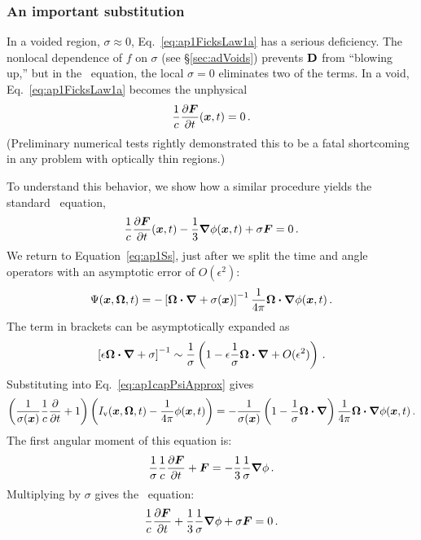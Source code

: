 \subsubsection{An important substitution}
In a voided region, $\sigma\approx 0$, Eq.~\eqref{eq:ap1FicksLaw1a}
has a serious deficiency. The nonlocal dependence of $f$ on $\sigma$ (see
\S\ref{sec:adVoids}) prevents $\mathbf{D}$ from ``blowing up,'' but in the \APone\
equation, the local $\sigma=0$ eliminates two of the terms. In a void,
Eq.~\eqref{eq:ap1FicksLaw1a} becomes the unphysical
\begin{equation*}
  \frac{1}{c}\frac{\partial \bm{F}}{\partial t}(\bm{x},t) = 0\,.
\end{equation*}
(Preliminary numerical tests rightly demonstrated this to be a fatal
shortcoming in any problem with optically thin regions.)

To understand this behavior, we show how a similar procedure yields the standard
\Pone\ equation,
\begin{equation*}
  \frac{1}{c}\frac{\partial \bm{F}}{\partial t}(\bm{x},t) - \frac{1}{3}\bm{\nabla} \phi(\bm{x},t)
  + \sigma \bm{F} = 0\,.
\end{equation*}
We return to Equation~\eqref{eq:ap1Ss}, just after we split the time and angle
operators with an asymptotic error of $O(\epsilon^2)$:
\begin{equation*}
  \Psi(\bm{x},\bm{\Omega},t)
  = - \left[ \bm{\Omega}\bm{\cdot} \bm{\nabla} + \sigma(\bm{x}) \right]^{-1} \frac{1}{4\pi} \bm{\Omega}\bm{\cdot} \bm{\nabla} \phi (\bm{x},t)\,.
\end{equation*}
The term in brackets can be asymptotically expanded as
\begin{equation*}
  \left[ \epsilon \bm{\Omega}\bm{\cdot} \bm{\nabla} + \sigma \right]^{-1}
  \sim \frac{1}{\sigma} \left( 1
  - \epsilon \frac{1}{\sigma} \bm{\Omega}\bm{\cdot} \bm{\nabla} + O(\epsilon^2) \right)\,.
\end{equation*}
Substituting into Eq.~\eqref{eq:ap1capPsiApprox} gives
\begin{equation*}
  \left( \frac{1}{\sigma(\bm{x})} \frac{1}{c}\frac{\partial }{\partial t} + 1 \right)
  \left( I_\mathrm{v}(\bm{x},\bm{\Omega},t) - \frac{1}{4\pi} \phi(\bm{x},t) \right)
  = - \frac{1}{\sigma(\bm{x})} \left( 1 - \frac{1}{\sigma} \bm{\Omega}\bm{\cdot}
  \bm{\nabla} \right) \frac{1}{4\pi} \bm{\Omega}\bm{\cdot} \bm{\nabla} \phi(\bm{x},t) \,.
\end{equation*}
The first angular moment of this equation is:
\begin{equation*}
  \frac{1}{\sigma} \frac{1}{c}\frac{\partial \bm{F}}{\partial t} 
  + \bm{F}
  = - \frac{1}{3}\frac{1}{\sigma} \bm{\nabla} \phi \,.
\end{equation*}
Multiplying by $\sigma$ gives the \Pone\ equation:
\begin{equation*}
  \frac{1}{c}\frac{\partial \bm{F}}{\partial t} + \frac{1}{3}\frac{1}{\sigma} \bm{\nabla} \phi
  + \sigma\bm{F}
  = 0 \,.
\end{equation*}

